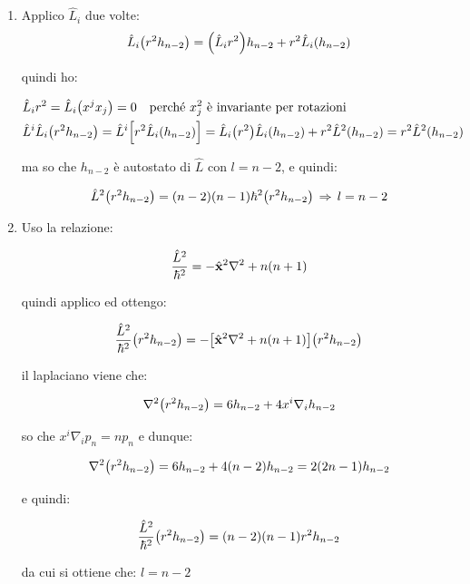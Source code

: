 \begin{enumerate}	
	\item Applico $\hat{L}_i$ due volte:
	\begin{align*}
		\hat{L}_i \qty(r^2 h_{n-2}) = \qty( \hat{L}_i r^2) h_{n-2} + r^2 \hat{L}_i \qty(h_{n-2})
	\end{align*}
	
		quindi ho:
		
	\begin{align*}
		& \hat{L}_i r^2 = \hat{L}_i \qty(x^j x_j) = 0  \quad \text{perché $x^2_j$ è invariante per rotazioni} \\
		& \hat{L}^i \hat{L}_i \qty(r^2 h_{n-2}) = \hat{L}^i \qty[ r^2 \hat{L}_i \qty(h_{n-2}) ] = \hat{L}_i \qty(r^2) \hat{L}_i \qty(h_{n-2}) + r^2 \hat{L}^2 \qty(h_{n-2}) = r^2 \hat{L}^2 \qty(h_{n-2})
	\end{align*}

		ma so che $h_{n-2}$ è autostato di $\hat{L}$ con $l = n -2 $, e quindi:
	
	\begin{align*}
		\hat{L}^2 \qty(r^2 h_{n -2}) = \qty(n-2) \qty(n-1) \hbar^2 \qty(r^2 h_{n-2}) \, \Rightarrow \, l = n -2
	\end{align*}

	\item Uso la relazione:
	
	\begin{align*}
		\frac{\hat{L}^2}{\hbar^2} = - \hat{\vb{x}}^2 \nabla^2 + n \qty(n + 1)
	\end{align*}
		
		quindi applico ed ottengo:
		
	\begin{align*}
		\frac{\hat{L}^2}{\hbar^2} \qty(r^2 h_{n-2}) = - \qty[\hat{\vb{x}}^2 \nabla^2 + n \qty(n + 1)] \qty(r^2 h_{n-2})
	\end{align*}
	
		il laplaciano viene che:
		
	\begin{align*}
		\nabla^2 \qty(r^2 h_{n-2}) = 6 h_{n-2} + 4 x^i \nabla_i h_{n-2}
	\end{align*}

		so che $x^i \nabla_i p_n = n p_n$ e dunque:
		
	\begin{align*}
		\nabla^2 \qty(r^2 h_{n-2}) = 6 h_{n-2} + 4\qty(n-2) h_{n-2} = 2 \qty(2n -1) h_{n-2}
	\end{align*}
	
		e quindi:
	
	\begin{align*}
		\frac{\hat{L}^2}{\hbar^2} \qty(r^2 h_{n-2}) = \qty(n-2) \qty(n -1) r^2 h_{n-2}
	\end{align*}
	
		da cui si ottiene che: $l = n -2 $

\end{enumerate}

